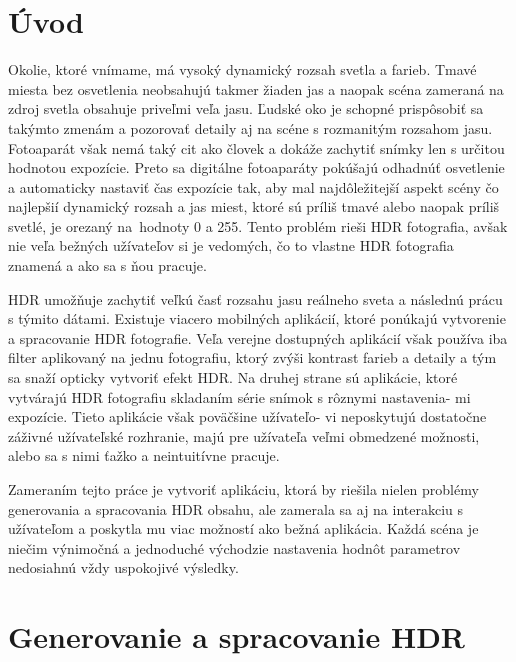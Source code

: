 \documentclass[slovak]{ExcelAtFIT}
\affiliation{*%
  \href{mailto:xmicha65@stud.fit.vutbr.cz}{xmicha65@stud.fit.vutbr.cz},
  \textit{Fakulta informačních technologií Vysokého učení technického v Brně }}
\begin{document}
\startdocument


\section{Úvod}

Okolie, ktoré vnímame, má vysoký dynamický rozsah svetla a farieb. Tmavé miesta bez osvetlenia neobsahujú takmer žiaden jas a naopak
scéna zameraná na zdroj svetla obsahuje priveľmi veľa jasu. Ľudské oko je schopné prispôsobiť sa takýmto zmenám a pozorovať detaily
aj na scéne s rozmanitým rozsahom jasu. Fotoaparát však nemá taký cit ako človek a dokáže zachytiť snímky len s určitou
hodnotou expozície. Preto sa digitálne fotoaparáty pokúšajú odhadnúť osvetlenie a automaticky nastaviť čas expozície tak, aby mal
najdôležitejší aspekt scény čo najlepšií dynamický rozsah a jas miest, ktoré sú príliš tmavé alebo naopak príliš svetlé, je orezaný
na~hodnoty 0 a 255. Tento problém rieši HDR fotografia, avšak nie veľa bežných užívateľov si je vedomých, čo to vlastne HDR fotografia
znamená a ako sa s ňou pracuje.

HDR umožňuje zachytiť veľkú časť rozsahu jasu reálneho sveta a následnú prácu s týmito dátami. Existuje viacero mobilných aplikácií,
ktoré ponúkajú vytvorenie a spracovanie HDR fotografie. Veľa verejne dostupných aplikácií však používa iba filter aplikovaný na jednu
fotografiu, ktorý zvýši kontrast farieb a detaily a tým sa snaží opticky vytvoriť efekt HDR. Na druhej strane sú aplikácie, ktoré
vytvárajú HDR fotografiu skladaním série snímok s rôznymi nastavenia- mi expozície. Tieto aplikácie však poväčšine užívateľo- vi neposkytujú
dostatočne záživné užívateľské rozhranie, majú pre užívateľa veľmi obmedzené možnosti, alebo sa s nimi ťažko a neintuitívne pracuje.

Zameraním tejto práce je vytvoriť aplikáciu, ktorá by riešila nielen problémy generovania a spracovania HDR obsahu, ale zamerala sa aj na
interakciu s užívateľom a poskytla mu viac možností ako bežná aplikácia. Každá scéna je niečim výnimočná a jednoduché východzie nastavenia
hodnôt parametrov nedosiahnú vždy uspokojivé výsledky.

\section{Generovanie a spracovanie HDR}
\label{sec:Theory}
\end{document}
